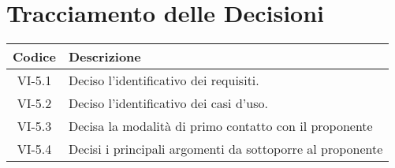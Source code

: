 \section*{Tracciamento delle Decisioni}

\begin{center}
	\begin{longtable}{|c|p{14.5cm}|}
	\hline
	\rowcolor{lighter-grayer}
	\textbf{Codice} & \textbf{Descrizione} \\
	\hline
	\endfirsthead

	\hline
	VI-5.1 & Deciso l'identificativo dei requisiti. \\
	\hline
	VI-5.2 & Deciso l'identificativo dei casi d'uso. \\
	\hline
	VI-5.3 & Decisa la modalità di primo contatto con il proponente \\
	\hline
	VI-5.4 & Decisi i principali argomenti da sottoporre al proponente \\
	\hline

	\end{longtable}
\end{center}